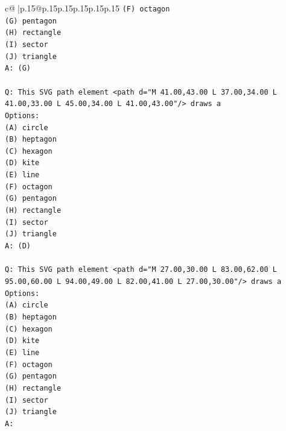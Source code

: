\documentclass{article}
\begin{document}
{\begin{supertabular}{c@{$\;$}|p{.15\linewidth}@{}p{.15\linewidth}p{.15\linewidth}p{.15\linewidth}p{.15\linewidth}p{.15\linewidth}}
{{{\texttt{(F) octagon} \\
\texttt{(G) pentagon} \\
\texttt{(H) rectangle} \\
\texttt{(I) sector} \\
\texttt{(J) triangle} \\
\texttt{A: (G)} \\
\\ 
\texttt{Q: This SVG path element <path d="M 41.00,43.00 L 37.00,34.00 L 41.00,33.00 L 45.00,34.00 L 41.00,43.00"/> draws a} \\
\texttt{Options:} \\
\texttt{(A) circle} \\
\texttt{(B) heptagon} \\
\texttt{(C) hexagon} \\
\texttt{(D) kite} \\
\texttt{(E) line} \\
\texttt{(F) octagon} \\
\texttt{(G) pentagon} \\
\texttt{(H) rectangle} \\
\texttt{(I) sector} \\
\texttt{(J) triangle} \\
\texttt{A: (D)} \\
\\ 
\texttt{Q: This SVG path element <path d="M 27.00,30.00 L 83.00,62.00 L 95.00,60.00 L 94.00,49.00 L 82.00,41.00 L 27.00,30.00"/> draws a} \\
\texttt{Options:} \\
\texttt{(A) circle} \\
\texttt{(B) heptagon} \\
\texttt{(C) hexagon} \\
\texttt{(D) kite} \\
\texttt{(E) line} \\
\texttt{(F) octagon} \\
\texttt{(G) pentagon} \\
\texttt{(H) rectangle} \\
\texttt{(I) sector} \\
\texttt{(J) triangle} \\
\texttt{A:} \\
            }
        }
    }
     \\ \\


\end{supertabular}}
\end{document}
